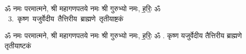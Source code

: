 \documentclass[17pt]{extarticle}
\begin{document}
\begin{titlepage}
    \begin{center}
 
\begin{sanskrit}
    { \Large
    ॐ नमः परमात्मने, श्री महागणपतये नमः
श्री गुरुभ्यो नमः, ह॒रिः॒ ॐ 
    }
    \\
    \vspace{2.5cm}
    \mbox{ \Huge
    3.      कृष्ण यजुर्वेदीय तैत्तिरीय ब्राह्मणे तृतीयाष्टकं    }
\end{sanskrit}
\end{center}

\end{titlepage}
\tableofcontents
\pagebreak
ॐ नमः परमात्मने, श्री महागणपतये नमः
श्री गुरुभ्यो नमः, ह॒रिः॒ ॐ .      कृष्ण यजुर्वेदीय तैत्तिरीय ब्राह्मणे तृतीयाष्टकं  \newline
\end{document}
